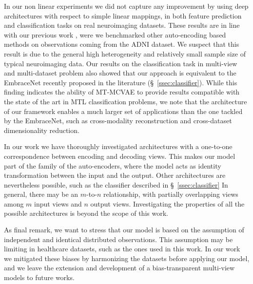 In our non linear experiments we did not capture any improvement by using deep architectures with respect to simple linear mappings,
in both feature prediction  and classification tasks  on real neuroimaging datasets.
These results are in line with our previous work \citep{Antelmi2019}, were we benchmarked other auto-encoding based methods on observations coming from the ADNI dataset.
We suspect that this result is due to the general high heterogeneity and relatively small sample size of typical neuroimaging data.
	Our results on the classification task in multi-view and multi-dataset problem also showed that our approach is equivalent to the EmbraceNet \citep{embracenet} recently proposed in the literature (\S~\ref{ssec:classifier}).
	While this finding indicates the ability of MT-MCVAE to provide results compatible with the state of the art in MTL classification problems,
	we note that the architecture of our framework enables a much larger set of applications than the one tackled by the EmbraceNet,
	such as cross-modality reconstruction and cross-dataset dimensionality reduction.

In our work we have thoroughly investigated architectures with a one-to-one correspondence between encoding and decoding views.
This makes our model part of the family of the auto-encoders, where the model acts as identity transformation between the input and the output.
Other architectures are nevertheless possible, such as the classifier described in \S~\ref{ssec:classifier}
In general, there may be an $m$-to-$n$ relationship, with partially overlapping views among $m$ input views and $n$ output views.
Investigating the properties of all the possible architectures is beyond the scope of this work.

	As final remark, we want to stress that our model is based on the assumption of independent and identical distributed observations.
	This assumption may be limiting in healthcare datasets, such as the ones used in this work.
	In our work we mitigated these biases by harmonizing the datasets before applying our model, and we leave the extension and development of a bias-transparent multi-view models to future works.
